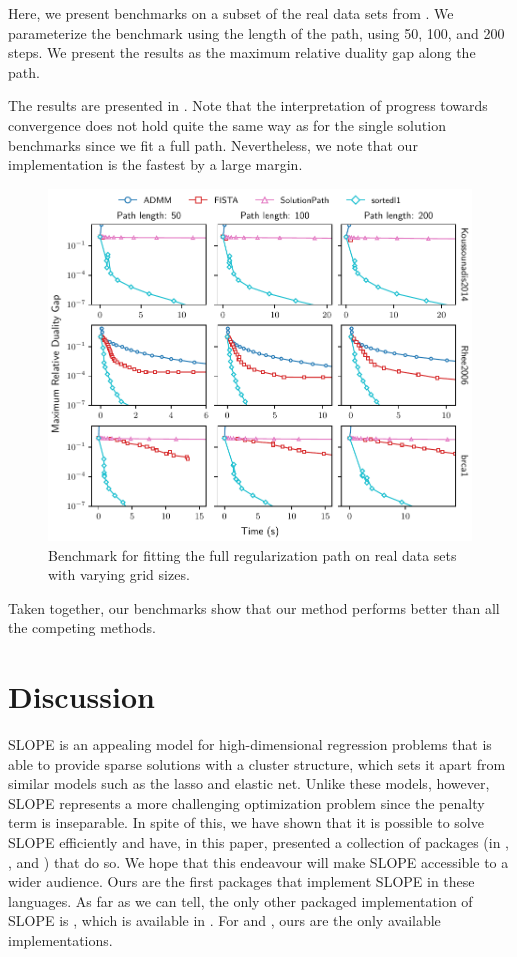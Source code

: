 \documentclass[article]{jss}
\makeatletter
\let\Cref\crtCref
\let\natwidth\Gin@nat@width
\makeatother
\begin{document}
Here, we present benchmarks
on a subset of the real data sets from \Cref{tab:real-data}. We parameterize
the benchmark using the length of the path, using 50, 100, and 200 steps. We
present the results as the maximum relative duality gap along the path.

The results are presented in \Cref{fig:real-data-path}. Note that the interpretation
of progress towards convergence does not hold quite the same way as for the single
solution benchmarks since we fit a full path. Nevertheless, we note that our
implementation is the fastest by a large margin.

\begin{figure}[tp]
  \centering
  \includegraphics[width=\natwidth]{images/benchmark_path_real.pdf}
  \caption{%
    Benchmark for fitting the full regularization path on real data sets with
    varying grid sizes.
  }
  \label{fig:real-data-path}
\end{figure}

Taken together, our benchmarks show that our method performs better
than all the competing methods.

\section{Discussion}\label{sec:discussion}

SLOPE is an appealing model for high-dimensional regression problems that is
able to provide sparse solutions with a cluster structure, which sets it apart
from similar models such as the lasso and elastic net. Unlike these models,
however, SLOPE represents a more challenging optimization problem since the
penalty term is inseparable. In spite of this, we have shown that it is
possible to solve SLOPE efficiently and have, in this paper, presented a collection
of packages (in , , and ) that do
so. We hope that this endeavour will make SLOPE accessible to a wider audience.
Ours are the first packages that implement SLOPE in these languages.
As far as we can tell, the only other packaged implementation of SLOPE
is , which is available in . For
 and , ours are the only
available implementations.
\end{document}
